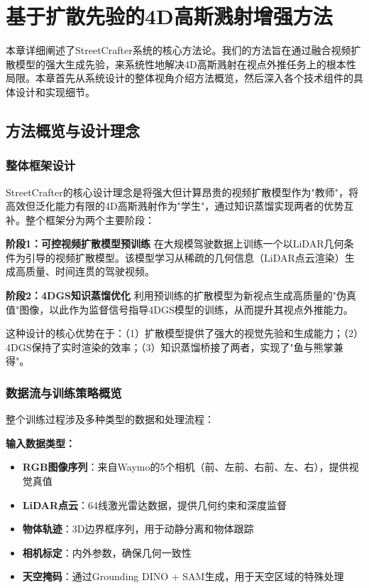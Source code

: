
\chapter{基于扩散先验的4D高斯溅射增强方法}

本章详细阐述了StreetCrafter系统的核心方法论。我们的方法旨在通过融合视频扩散模型的强大生成先验，来系统性地解决4D高斯溅射在视点外推任务上的根本性局限。本章首先从系统设计的整体视角介绍方法概览，然后深入各个技术组件的具体设计和实现细节。

\section{方法概览与设计理念}

\subsection{整体框架设计}

StreetCrafter的核心设计理念是将强大但计算昂贵的视频扩散模型作为"教师"，将高效但泛化能力有限的4D高斯溅射作为"学生"，通过知识蒸馏实现两者的优势互补。整个框架分为两个主要阶段：

\textbf{阶段1：可控视频扩散模型预训练}
在大规模驾驶数据上训练一个以LiDAR几何条件为引导的视频扩散模型。该模型学习从稀疏的几何信息（LiDAR点云渲染）生成高质量、时间连贯的驾驶视频。

\textbf{阶段2：4DGS知识蒸馏优化}
利用预训练的扩散模型为新视点生成高质量的"伪真值"图像，以此作为监督信号指导4DGS模型的训练，从而提升其视点外推能力。

这种设计的核心优势在于：（1）扩散模型提供了强大的视觉先验和生成能力；（2）4DGS保持了实时渲染的效率；（3）知识蒸馏桥接了两者，实现了"鱼与熊掌兼得"。

\subsection{数据流与训练策略概览}

整个训练过程涉及多种类型的数据和处理流程：

\textbf{输入数据类型：}
\begin{itemize}
\item \textbf{RGB图像序列}：来自Waymo的5个相机（前、左前、右前、左、右），提供视觉真值
\item \textbf{LiDAR点云}：64线激光雷达数据，提供几何约束和深度监督
\item \textbf{物体轨迹}：3D边界框序列，用于动静分离和物体跟踪
\item \textbf{相机标定}：内外参数，确保几何一致性
\item \textbf{天空掩码}：通过Grounding DINO + SAM生成，用于天空区域的特殊处理
\end{itemize}

